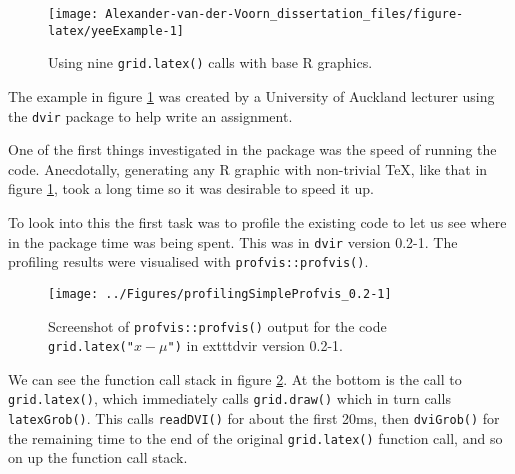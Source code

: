 \documentclass[]{article}
\newenvironment{Shaded}{\begin{snugshade}}{\end{snugshade}}
\newcommand{\KeywordTok}[1]{\textcolor[rgb]{0.13,0.29,0.53}{\textbf{#1}}}
\newcommand{\DataTypeTok}[1]{\textcolor[rgb]{0.13,0.29,0.53}{#1}}
\newcommand{\FloatTok}[1]{\textcolor[rgb]{0.00,0.00,0.81}{#1}}
\newcommand{\CharTok}[1]{\textcolor[rgb]{0.31,0.60,0.02}{#1}}
\newcommand{\StringTok}[1]{\textcolor[rgb]{0.31,0.60,0.02}{#1}}
\newcommand{\NormalTok}[1]{#1}
\begin{document}
\begin{Shaded}
\end{Shaded}

\begin{figure}

{\centering \texttt{[image: Alexander-van-der-Voorn\_dissertation\_files/figure-latex/yeeExample-1]} 

}

\caption{Using nine \texttt{grid.latex()} calls with base R graphics.}\label{fig:yeeExample}
\end{figure}

The example in figure \ref{fig:yeeExample} was created by a University
of Auckland lecturer using the \texttt{dvir} package to help write an
assignment.

One of the first things investigated in the package was the speed of
running the code. Anecdotally, generating any R graphic with non-trivial
\TeX{}, like that in figure \ref{fig:yeeExample}, took a long time so it
was desirable to speed it up.

To look into this the first task was to profile the existing code to let
us see where in the package time was being spent. This was in
\texttt{dvir} version 0.2-1. The profiling results were visualised with
\texttt{profvis::profvis()}.

\begin{figure}

{\centering \texttt{[image: ../Figures/profilingSimpleProfvis\_0.2-1]} 

}

\caption{Screenshot of \texttt{profvis::profvis()} output for the code \texttt{grid.latex("$x - \mu$")} in  exttt{dvir} version 0.2-1.}\label{fig:prof1}
\end{figure}

We can see the function call stack in figure \ref{fig:prof1}. At the
bottom is the call to \texttt{grid.latex()}, which immediately calls
\texttt{grid.draw()} which in turn calls \texttt{latexGrob()}. This
calls \texttt{readDVI()} for about the first 20ms, then
\texttt{dviGrob()} for the remaining time to the end of the original
\texttt{grid.latex()} function call, and so on up the function call
stack.
\end{document}
